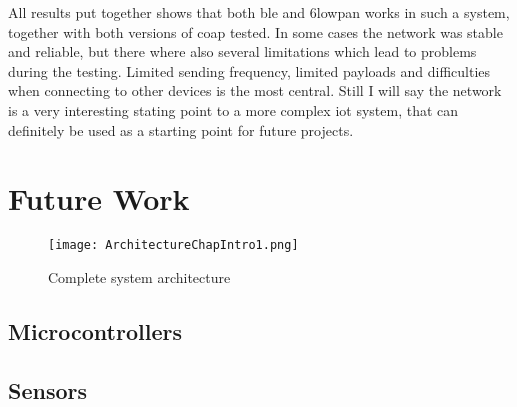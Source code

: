\noindent All results put together shows that both \gls{ble} and \gls{6lowpan} works in such a system, together with both versions of \gls{coap} tested. In some cases the network was stable and reliable, but there where also several limitations which lead to problems during the testing. Limited sending frequency, limited payloads and difficulties when connecting to other devices is the most central. Still I will say the network is a very interesting stating point to a more complex \gls{iot} system, that can definitely be used as a starting point for future projects. 


\section{Future Work}

\begin{figure}[ht]
    \centering
    \texttt{[image: ArchitectureChapIntro1.png]}    
    \caption{Complete system architecture}
    \label{fig:systemArchitecture}
\end{figure}

\subsection{Microcontrollers}

\subsection{Sensors}

